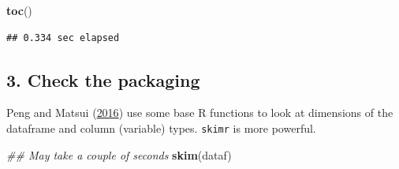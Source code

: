 \documentclass[
]{article}
\newenvironment{Shaded}{\begin{snugshade}}{\end{snugshade}}
\newcommand{\CommentTok}[1]{\textcolor[rgb]{0.56,0.35,0.01}{\textit{#1}}}
\newcommand{\KeywordTok}[1]{\textcolor[rgb]{0.13,0.29,0.53}{\textbf{#1}}}
\newcommand{\NormalTok}[1]{#1}
\begin{document}
\begin{Shaded}
\begin{Highlighting}[]
\KeywordTok{toc}\NormalTok{()}
\end{Highlighting}
\end{Shaded}

\begin{verbatim}
## 0.334 sec elapsed
\end{verbatim}

\begin{Shaded}
\end{Shaded}

\hypertarget{check-the-packaging}{%
\subsection{3. Check the packaging}\label{check-the-packaging}}

Peng and Matsui (\protect\hyperlink{ref-PengArtDataScience2016}{2016}) use some base R functions to look at dimensions of the dataframe and column (variable) types. \texttt{skimr} is more powerful.

\begin{Shaded}
\begin{Highlighting}[]
\CommentTok{\#\# May take a couple of seconds}
\KeywordTok{skim}\NormalTok{(dataf)}
\end{Highlighting}
\end{Shaded}
\end{document}
